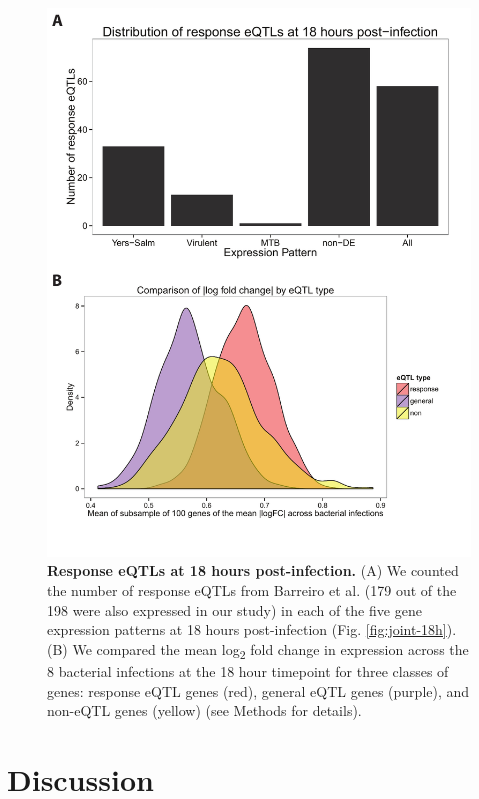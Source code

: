 \begin{figure}
\centering
\includegraphics[width=5in]{img/ch02/fig-05-response-eqtl.pdf}
\caption[Response eQTLs at 18 hours post-infection.]{\textbf{Response
    eQTLs at 18 hours post-infection.} (A) We counted the number of
  response eQTLs from Barreiro et al. \citep{Barreiro2012} (179 out of
  the 198 were also expressed in our study) in each of the five gene
  expression patterns at 18 hours post-infection
  (Fig. \ref{fig:joint-18h}).  (B) We compared the mean
  log\textsubscript{2} fold change in expression across the 8
  bacterial infections at the 18 hour timepoint for three classes of
  genes: response eQTL genes (red), general eQTL genes (purple), and
  non-eQTL genes (yellow) (see Methods for details).  }
\label{fig:response-eqtl}
\end{figure}

\section{Discussion}\label{discussion}

